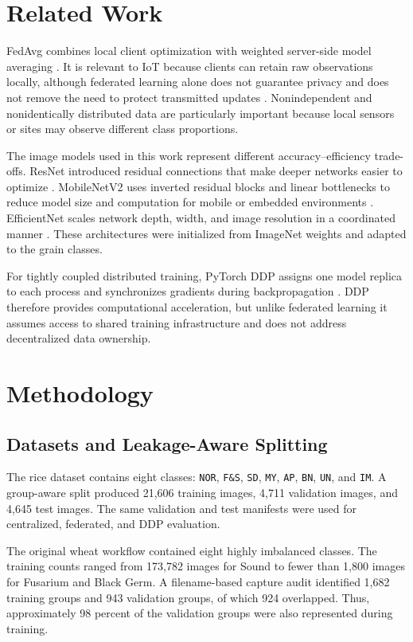 \documentclass[conference]{IEEEtran}
\begin{document}
\section{Related Work}

FedAvg combines local client optimization with weighted server-side model averaging \cite{mcmahan2017}. It is relevant to IoT because clients can retain raw observations locally, although federated learning alone does not guarantee privacy and does not remove the need to protect transmitted updates \cite{nguyen2021}. Nonindependent and nonidentically distributed data are particularly important because local sensors or sites may observe different class proportions.

The image models used in this work represent different accuracy--efficiency trade-offs. ResNet introduced residual connections that make deeper networks easier to optimize \cite{he2016}. MobileNetV2 uses inverted residual blocks and linear bottlenecks to reduce model size and computation for mobile or embedded environments \cite{sandler2018}. EfficientNet scales network depth, width, and image resolution in a coordinated manner \cite{tan2019}. These architectures were initialized from ImageNet weights and adapted to the grain classes.

For tightly coupled distributed training, PyTorch DDP assigns one model replica to each process and synchronizes gradients during backpropagation \cite{li2020ddp,paszke2019}. DDP therefore provides computational acceleration, but unlike federated learning it assumes access to shared training infrastructure and does not address decentralized data ownership.

\section{Methodology}

\subsection{Datasets and Leakage-Aware Splitting}

The rice dataset contains eight classes: \texttt{NOR}, \texttt{F\&S}, \texttt{SD}, \texttt{MY}, \texttt{AP}, \texttt{BN}, \texttt{UN}, and \texttt{IM}. A group-aware split produced 21,606 training images, 4,711 validation images, and 4,645 test images. The same validation and test manifests were used for centralized, federated, and DDP evaluation.

The original wheat workflow contained eight highly imbalanced classes. The training counts ranged from 173,782 images for Sound to fewer than 1,800 images for Fusarium and Black Germ. A filename-based capture audit identified 1,682 training groups and 943 validation groups, of which 924 overlapped. Thus, approximately 98 percent of the validation groups were also represented during training.
\end{document}
